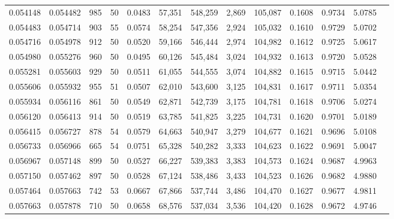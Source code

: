 \begin{tabular}{rrrrrrrrrrrrr}
0.054148 & 0.054482 &   985 &  50 &                                     0.0483 &  57,351 & 548,259 &   2,869 & 105,087 & 0.1608 & 0.9734 & 5.0785 \\
0.054483 & 0.054714 &   903 &  55 &                                     0.0574 &  58,254 & 547,356 &   2,924 & 105,032 & 0.1610 & 0.9729 & 5.0702 \\
0.054716 & 0.054978 &   912 &  50 &                                     0.0520 &  59,166 & 546,444 &   2,974 & 104,982 & 0.1612 & 0.9725 & 5.0617 \\
0.054980 & 0.055276 &   960 &  50 &                                     0.0495 &  60,126 & 545,484 &   3,024 & 104,932 & 0.1613 & 0.9720 & 5.0528 \\
0.055281 & 0.055603 &   929 &  50 &                                     0.0511 &  61,055 & 544,555 &   3,074 & 104,882 & 0.1615 & 0.9715 & 5.0442 \\
0.055606 & 0.055932 &   955 &  51 &                                     0.0507 &  62,010 & 543,600 &   3,125 & 104,831 & 0.1617 & 0.9711 & 5.0354 \\
0.055934 & 0.056116 &   861 &  50 &                                     0.0549 &  62,871 & 542,739 &   3,175 & 104,781 & 0.1618 & 0.9706 & 5.0274 \\
0.056120 & 0.056413 &   914 &  50 &                                     0.0519 &  63,785 & 541,825 &   3,225 & 104,731 & 0.1620 & 0.9701 & 5.0189 \\
0.056415 & 0.056727 &   878 &  54 &                                     0.0579 &  64,663 & 540,947 &   3,279 & 104,677 & 0.1621 & 0.9696 & 5.0108 \\
0.056733 & 0.056966 &   665 &  54 &                                     0.0751 &  65,328 & 540,282 &   3,333 & 104,623 & 0.1622 & 0.9691 & 5.0047 \\
0.056967 & 0.057148 &   899 &  50 &                                     0.0527 &  66,227 & 539,383 &   3,383 & 104,573 & 0.1624 & 0.9687 & 4.9963 \\
0.057150 & 0.057462 &   897 &  50 &                                     0.0528 &  67,124 & 538,486 &   3,433 & 104,523 & 0.1626 & 0.9682 & 4.9880 \\
0.057464 & 0.057663 &   742 &  53 &                                     0.0667 &  67,866 & 537,744 &   3,486 & 104,470 & 0.1627 & 0.9677 & 4.9811 \\
0.057663 & 0.057878 &   710 &  50 &                                     0.0658 &  68,576 & 537,034 &   3,536 & 104,420 & 0.1628 & 0.9672 & 4.9746 \\

\end{tabular}
